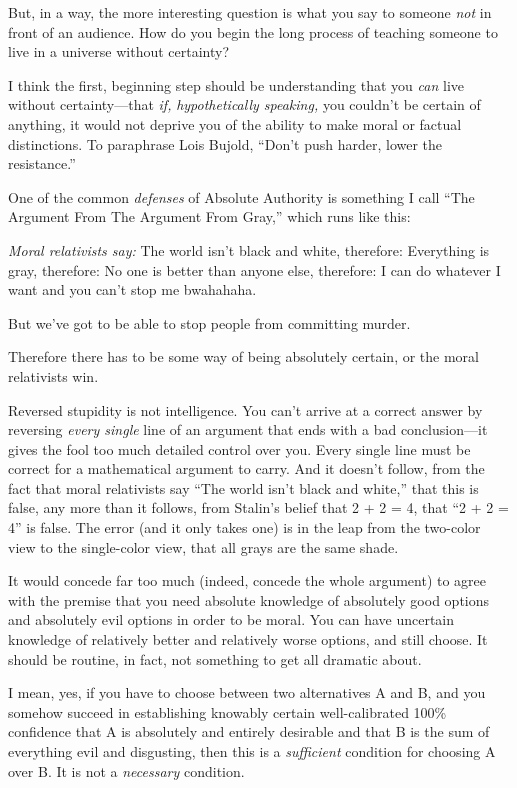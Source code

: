 {
 But, in a way, the more interesting question is what you say to
someone \textit{not} in front of an audience. How do you begin the long
process of teaching someone to live in a universe without certainty?}

{
 I think the first, beginning step should be understanding that you
\textit{can} live without certainty---that \textit{if,}
\textit{hypothetically speaking,} you couldn't be
certain of anything, it would not deprive you of the ability to make
moral or factual distinctions. To paraphrase Lois Bujold,
``Don't push harder, lower the
resistance.''}

{
 One of the common \textit{defenses} of Absolute Authority is
something I call ``The Argument From The Argument From
Gray,'' which runs like this:}

{
  \textit{Moral relativists say:} The world isn't
black and white, therefore: Everything is gray, therefore: No one is
better than anyone else, therefore: I can do whatever I want and you
can't stop me bwahahaha. }

{
 But we've got to be able to stop people from
committing murder.}

{
 Therefore there has to be some way of being absolutely certain, or
the moral relativists win.}

{
 Reversed stupidity is not intelligence. You can't
arrive at a correct answer by reversing \textit{every single} line of
an argument that ends with a bad conclusion---it gives the fool too
much detailed control over you. Every single line must be correct for a
mathematical argument to carry. And it doesn't follow,
from the fact that moral relativists say ``The world
isn't black and white,'' that this is
false, any more than it follows, from Stalin's belief
that 2 + 2 = 4, that ``2 + 2 = 4''
is false. The error (and it only takes one) is in the leap from the
two-color view to the single-color view, that all grays are the same
shade.}

{
 It would concede far too much (indeed, concede the whole argument)
to agree with the premise that you need absolute knowledge of
absolutely good options and absolutely evil options in order to be
moral. You can have uncertain knowledge of relatively better and
relatively worse options, and still choose. It should be routine, in
fact, not something to get all dramatic about.}

{
 I mean, yes, if you have to choose between two alternatives A and
B, and you somehow succeed in establishing knowably certain
well-calibrated 100\% confidence that A is absolutely and entirely
desirable and that B is the sum of everything evil and disgusting, then
this is a \textit{sufficient} condition for choosing A over B. It is
not a \textit{necessary} condition.}

